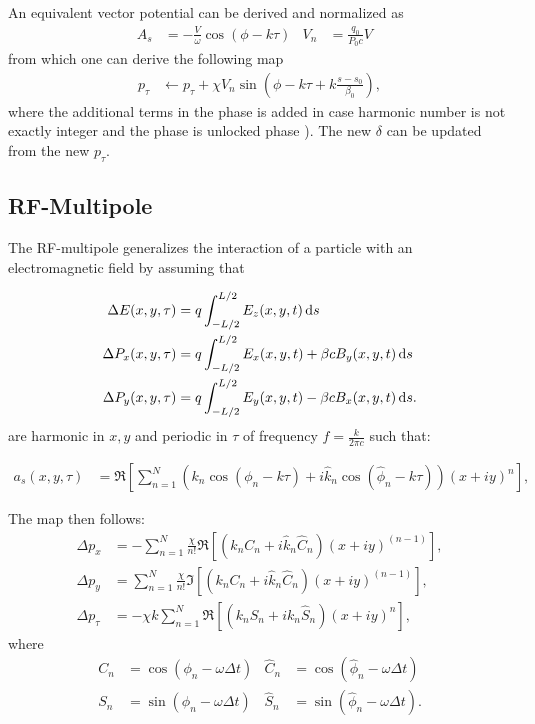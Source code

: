 An equivalent vector potential can be derived and normalized as
\begin{align}
A_s& = - \frac{V}{\omega} \cos(\phi - k \tau ) & 
V_n&=  \frac{q_0}{P_0 c} V  & 
\end{align}
from which one can derive the following map
\begin{align}
p_\tau & \leftarrow p_\tau + \chi V_n \sin(\phi - k \tau + k \frac{s-s_0}{\beta_0}  ),
\end{align}
where the additional terms in the phase is added in case harmonic number is not exactly
integer and the phase is unlocked phase ). The new $\delta$ can be updated from the new $p_\tau$.



\subsection{RF-Multipole}

The RF-multipole generalizes the interaction of a particle with an electromagnetic field by assuming that

\begin{align}
\Delta E(x,y,\tau) &= q \int_{-L/2}^{L/2} E_z(x,y,t)  {\rm \,d}s \\
\Delta P_x(x,y,\tau) &= q \int_{-L/2}^{L/2} E_x(x,y,t) + \beta c B_y(x,y,t) {\rm \,d}s\\
\Delta P_y(x,y,\tau) &= q \int_{-L/2}^{L/2} E_y(x,y,t) - \beta c B_x(x,y,t) {\rm \,d}s.
\end{align}
are harmonic in $x,y$ and periodic in $\tau$ of frequency $f=\frac{k}{2\pi c}$ such that:

\begin{align}
a_s(x,y,\tau) 
&= \Re \left[ \sum_{n=1}^N
      \left(       k_n \cos(\phi_n -k \tau ) +
            i \hat k_n \cos(\hat \phi_n -k \tau)
      \right)    
      (x+i y )^n
     \right],
\end{align}

The map then follows:
\begin{align}
    \Delta p_x &= -\sum_{n=1}^N \frac{\chi}{n!} \Re\left[ (k_n C_n + i \hat k_n \hat C_n)(x+iy)^{(n-1)}\right], \\
    \Delta p_y &=  \sum_{n=1}^N \frac{\chi}{n!} \Im\left[ (k_n C_n + i \hat k_n \hat C_n)(x+iy)^{(n-1)}\right], \\
    \Delta p_\tau &= -\chi k \sum_{n=1}^N \Re\left[( k_n S_n + i k_n \hat S_n ) (x+iy)^n\right],
\end{align}
where
\begin{align}
     C_n&=\cos(\phi_n-\omega \Delta t) &
\hat C_n&=\cos(\hat \phi_n-\omega \Delta t) \\
     S_n&=\sin(\phi_n-\omega \Delta t) &
\hat S_n&=\sin(\hat \phi_n-\omega \Delta t) .
\end{align}


